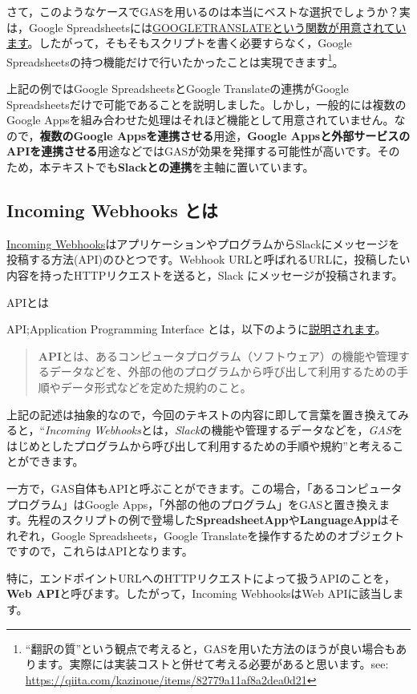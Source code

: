 \documentclass[uplatex,a4j]{jsarticle}
\begin{document}
さて，このようなケースでGASを用いるのは本当にベストな選択でしょうか？実は，Google Spreadsheetsには\href{https://support.google.com/docs/answer/3093331?hl=ja}{GOOGLETRANSLATEという関数が用意されています}。したがって，そもそもスクリプトを書く必要すらなく，Google Spreadsheetsの持つ機能だけで行いたかったことは実現できます\footnote{``翻訳の質''という観点で考えると，GASを用いた方法のほうが良い場合もあります。実際には実装コストと併せて考える必要があると思います。see: \href{https://qiita.com/kazinoue/items/82779a11af8a2dea0d21}{https://qiita.com/kazinoue/items/82779a11af8a2dea0d21}}。


上記の例ではGoogle SpreadsheetsとGoogle Translateの連携がGoogle Spreadsheetsだけで可能であることを説明しました。しかし，一般的には複数のGoogle Appsを組み合わせた処理はそれほど機能として用意されていません。なので，\textbf{複数のGoogle Appsを連携させる}用途，\textbf{Google Appsと外部サービスのAPIを連携させる}用途などではGASが効果を発揮する可能性が高いです。そのため，本テキストでも\textbf{Slackとの連携}を主軸に置いています。

\clearpage
\subsection{Incoming Webhooks とは}

\href{https://api.slack.com/messaging/webhooks}{Incoming Webhooks}はアプリケーションやプログラムからSlackにメッセージを投稿する方法(API)のひとつです。Webhook URLと呼ばれるURLに，投稿したい内容を持ったHTTPリクエストを送ると，Slack にメッセージが投稿されます。

\begin{itembox}[l]{APIとは}

API;Application Programming Interface とは，以下のように\href{http://e-words.jp/w/API.html}{説明されます}。

\begin{quote}
\textbf{API}とは、あるコンピュータプログラム（ソフトウェア）の機能や管理するデータなどを、外部の他のプログラムから呼び出して利用するための手順やデータ形式などを定めた規約のこと。
\end{quote}

上記の記述は抽象的なので，今回のテキストの内容に即して言葉を置き換えてみると，``\textit{Incoming Webhooks}とは，\textit{Slack}の機能や管理するデータなどを，\textit{GAS}をはじめとしたプログラムから呼び出して利用するための手順や規約''と考えることができます。


一方で，GAS自体もAPIと呼ぶことができます。この場合，「あるコンピュータプログラム」はGoogle Apps，「外部の他のプログラム」をGASと置き換えます。先程のスクリプトの例で登場した\textbf{SpreadsheetApp}や\textbf{LanguageApp}はそれぞれ，Google Spreadsheets，Google Translateを操作するためのオブジェクトですので，これらはAPIとなります。

特に，エンドポイントURLへのHTTPリクエストによって扱うAPIのことを，\textbf{Web API}と呼びます。したがって，Incoming WebhooksはWeb APIに該当します。

\end{itembox}
\end{document}
